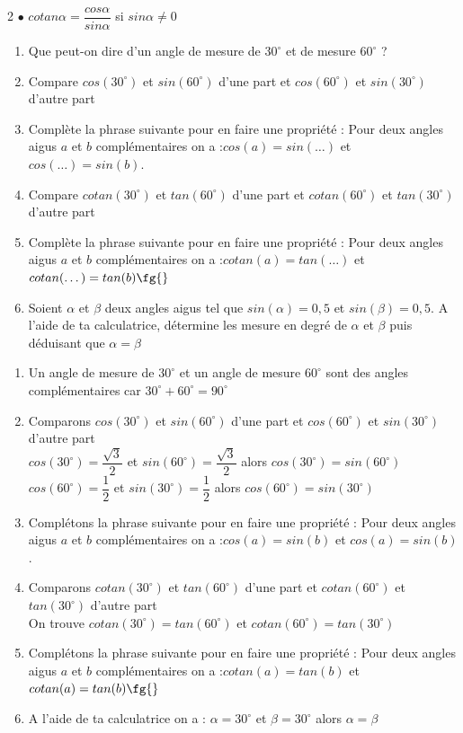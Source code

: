 \begin{multicols*}{2}
{  		$\bullet$ $cotan\alpha=\dfrac{cos\alpha}{sin\alpha}$ si $sin\alpha\neq 0$
  	}
  	\begin{enumerate}
  		\item Que peut-on dire d'un angle de mesure de $ 30^\circ  $ et de mesure $ 60^\circ $ ?
  		\item Compare $cos(30^\circ) $ et $sin(60^\circ)  $ d'une part et $cos(60^\circ) $ et $sin(30^\circ)  $ d'autre part
  		\item Complète la phrase suivante pour en faire une propriété : \og Pour deux angles aigus $ a $ et $ b $ complémentaires on a :$cos(a) =sin(\dots)  $  et $cos( \dots ) =sin(b)  $. \fg{}
  		\item Compare $cotan(30^\circ) $ et $tan(60^\circ)  $ d'une part et $cotan(60^\circ) $ et $tan(30^\circ)  $ d'autre part
  		\item Complète la phrase suivante pour en faire une propriété : \og Pour deux angles aigus $ a $ et $ b $ complémentaires on a :$cotan(a) =tan(\dots)  $  et $cotan( \dots ) =tan(b)    \fg{}$
  		\item Soient $ \alpha $ et $ \beta $ deux angles aigus tel que $ sin(\alpha) =0,5$ et $ sin(\beta)=0,5 $. A l'aide de ta calculatrice, détermine les mesure en degré de $ \alpha
  		$ et $ \beta $ puis déduisant que $ \alpha=\beta $
  	\end{enumerate}
  	\dure
  	\resul
  	\begin{enumerate}
  		\item  Un angle de mesure de $ 30^\circ  $ et un angle de mesure $ 60^\circ $ sont des angles complémentaires car $ 30^\circ +60^\circ =90^\circ  $
  		\item Comparons $cos(30^\circ) $ et $sin(60^\circ)  $ d'une part et $cos(60^\circ) $ et $sin(30^\circ)  $ d'autre part\\
  		$ cos(30^\circ)=\dfrac{\sqrt{3}}{2} $ et $ sin(60^\circ)=\dfrac{\sqrt{3}}{2} $ alors $cos(30^\circ) =sin(60^\circ)$\\
  		$cos(60^\circ) =\dfrac{1}{2}$ et $sin(30^\circ)= \dfrac{1}{2} $ alors  $cos(60^\circ)=sin(30^\circ)  $
  		\item Complétons la phrase suivante pour en faire une propriété : \og Pour deux angles aigus $ a $ et $ b $ complémentaires on a :$cos(a) =sin(b)  $  et $cos( a ) =sin(b)  $. \fg{}
  		\item Comparons $cotan(30^\circ) $ et $tan(60^\circ)  $ d'une part et $cotan(60^\circ) $ et $tan(30^\circ)  $ d'autre part\\ On trouve 
  		$cotan(30^\circ) =tan(60^\circ)  $  et $cotan(60^\circ) =tan(30^\circ)  $
  		\item Complétons la phrase suivante pour en faire une propriété : \og Pour deux angles aigus $ a $ et $ b $ complémentaires on a :$cotan(a) =tan(b)  $  et $cotan(a ) =tan(b)    \fg{}$
  		\item   A l'aide de ta calculatrice on a   :  $ \alpha=30^\circ
  		$ et $ \beta=30^\circ $ alors $ \alpha=\beta $
  	\end{enumerate}
\end{multicols*}
